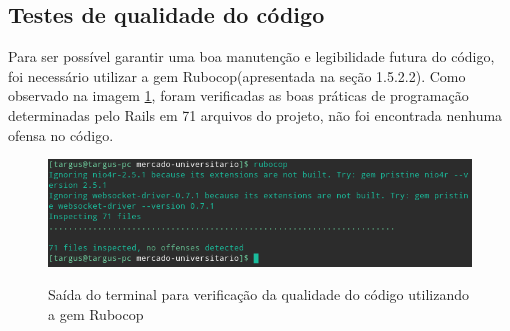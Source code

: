 \subsection{Testes de qualidade do código}
Para ser possível garantir uma boa manutenção e legibilidade futura do código, foi necessário utilizar a gem Rubocop(apresentada na seção 1.5.2.2). Como observado na imagem \ref{fig:rubocop}, foram verificadas as boas práticas de programação determinadas pelo Rails em 71 arquivos do projeto, não foi encontrada nenhuma ofensa no código.
\begin{figure}[htbp!]
  \centering
  \caption{Saída do terminal para verificação da qualidade do código utilizando a gem Rubocop}
  \includegraphics[width=1\textwidth]{figs/rubocop.png}
    \label{fig:rubocop}
\end{figure}